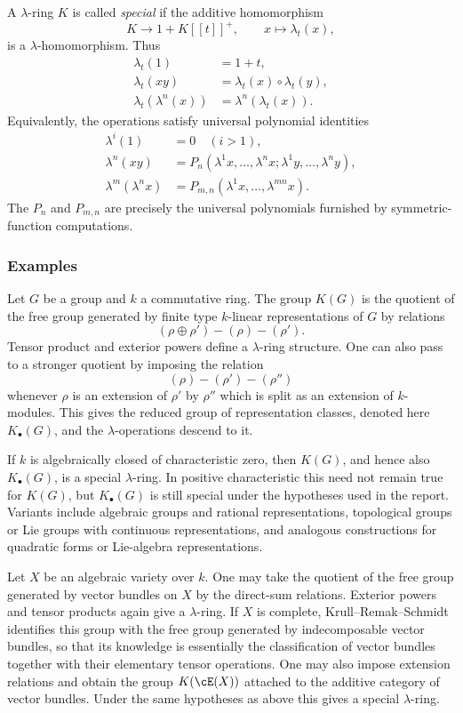 \documentclass[11pt]{article}
\theoremstyle{plain}
\theoremstyle{definition}
\theoremstyle{remark}
\begin{document}
A $\lambda$-ring $K$ is called \emph{special} if the additive homomorphism
\[
   K\to 1+K[[t]]^+,
   \qquad x\mapsto\lambda_t(x),
\]
is a $\lambda$-homomorphism. Thus
\begin{align}\label{eq:speciallambda}
\lambda_t(1)&=1+t,\\
\lambda_t(xy)&=\lambda_t(x)\circ\lambda_t(y),\\
\lambda_t(\lambda^n(x))&=\lambda^n(\lambda_t(x)).
\end{align}
Equivalently, the operations satisfy universal polynomial identities
\begin{align*}
\lambda^i(1)&=0\quad(i>1),\\
\lambda^n(xy)&=P_n(\lambda^1x,\ldots,\lambda^nx;\lambda^1y,\ldots,\lambda^ny),\\
\lambda^m(\lambda^n x)&=P_{m,n}(\lambda^1x,\ldots,\lambda^{mn}x).
\end{align*}
The $P_n$ and $P_{m,n}$ are precisely the universal polynomials furnished by symmetric-function computations.

\subsubsection{Examples}

Let $G$ be a group and $k$ a commutative ring. The group $K(G)$ is the quotient of the free group generated by finite type $k$-linear representations of $G$ by relations
\[
   (\rho\oplus\rho')-(\rho)-(\rho').
\]
Tensor product and exterior powers define a $\lambda$-ring structure. One can also pass to a stronger quotient by imposing the relation
\[
   (\rho)-(\rho')-(\rho'')
\]
whenever $\rho$ is an extension of $\rho'$ by $\rho''$ which is split as an extension of $k$-modules. This gives the reduced group of representation classes, denoted here $K_{\bullet}(G)$, and the $\lambda$-operations descend to it.

If $k$ is algebraically closed of characteristic zero, then $K(G)$, and hence also $K_{\bullet}(G)$, is a special $\lambda$-ring. In positive characteristic this need not remain true for $K(G)$, but $K_{\bullet}(G)$ is still special under the hypotheses used in the report. Variants include algebraic groups and rational representations, topological groups or Lie groups with continuous representations, and analogous constructions for quadratic forms or Lie-algebra representations.

Let $X$ be an algebraic variety over $k$. One may take the quotient of the free group generated by vector bundles on $X$ by the direct-sum relations. Exterior powers and tensor products again give a $\lambda$-ring. If $X$ is complete, Krull--Remak--Schmidt identifies this group with the free group generated by indecomposable vector bundles, so that its knowledge is essentially the classification of vector bundles together with their elementary tensor operations. One may also impose extension relations and obtain the group $K(\cE(X))$ attached to the additive category of vector bundles. Under the same hypotheses as above this gives a special $\lambda$-ring.
\end{document}
